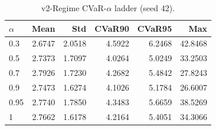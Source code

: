 \begin{table}[H]
    \centering
    \caption{v2-Regime CVaR-$\alpha$ ladder (seed 42).}
    \label{tab:v2_regime_alpha}
    \begin{tabular}{@{}lrrrrr@{}}
        \toprule
        $\alpha$ & Mean & Std & CVaR90 & CVaR95 & Max \\
        \midrule
        0.3 & 2.6747 & 2.0518 & 4.5922 & 6.2468 & 42.8468 \\
        0.5 & 2.7373 & 1.7097 & 4.0264 & 5.0249 & 33.2503 \\
        0.7 & 2.7926 & 1.7230 & 4.2682 & 5.4842 & 27.8243 \\
        0.9 & 2.7473 & 1.6274 & 4.1026 & 5.1784 & 26.6007 \\
        0.95 & 2.7740 & 1.7850 & 4.3483 & 5.6659 & 38.5269 \\
        1 & 2.7662 & 1.6178 & 4.2164 & 5.4051 & 34.3066 \\
        \bottomrule
    \end{tabular}
\end{table}
